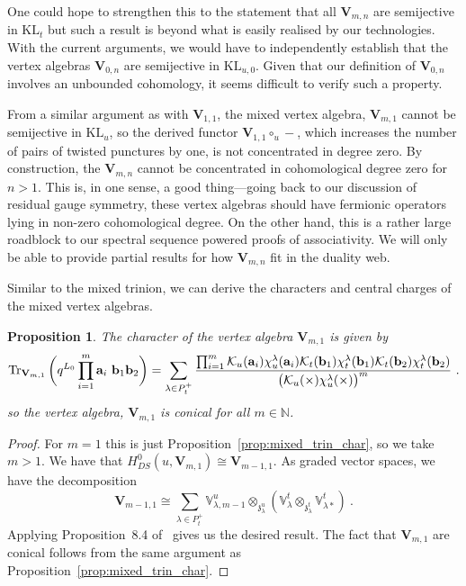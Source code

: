 \documentclass[a4paper]{article}
\newtheorem{prop}[thm]{Proposition}
\def\IN{\mathbb{N}}
\def\IV{\mathbb{V}}
\def\KK{{\cal K}}
\def\Tr{\mathop{\mathrm{Tr}}\nolimits}
\def \zf{\mathfrak{z}}
\def \KL{\mathrm{KL}}
\def\V{\mathbf{V}}
\begin{document}
One could hope to strengthen this to the statement that all $\V_{m,n}$ are semijective in $\KL_t$ but such a result is beyond what is easily realised by our technologies. With the current arguments, we would have to independently establish that the vertex algebras $\V_{0,n}$ are semijective in $\KL_{u,0}$. Given that our definition of $\V_{0,n}$ involves an unbounded cohomology, it seems difficult to verify such a property.

From a similar argument as with $\V_{1,1}$, the mixed vertex algebra, $\V_{m,1}$ cannot be semijective in $\KL_u$, so the derived functor $\V_{1,1}\circ_u-$, which increases the number of pairs of twisted punctures by one, is not concentrated in degree zero. By construction, the $\V_{m,n}$ cannot be concentrated in cohomological degree zero for $n>1$. This is, in one sense, a good thing---going back to our discussion of residual gauge symmetry, these vertex algebras should have fermionic operators lying in non-zero cohomological degree. On the other hand, this is a rather large roadblock to our spectral sequence powered proofs of associativity. We will only be able to provide partial results for how $\V_{m,n}$ fit in the duality web.

Similar to the mixed trinion, we can derive the characters and central charges of the mixed vertex algebras.
\begin{prop}\label{prop:mixed_char}
The character of the vertex algebra $\V_{m,1}$ is given by
\begin{equation*}
	\Tr_{\V_{m,1}}\bigg(q^{L_0}\prod_{i=1}^{m} \mathbf{a}_i \,\,\mathbf{b}_1\mathbf{b}_2\bigg) = \sum_{\lambda\in P_t^+} \frac{\prod_{i=1}^m \KK_u(\mathbf{a}_i)\chi^\lambda_u(\mathbf{a}_i) \KK_t(\mathbf{b}_1)\chi^\lambda_t(\mathbf{b}_1) \KK_t(\mathbf{b}_2)\chi^\lambda_t(\mathbf{b}_2) }{\big( \KK_u(\times)\chi^\lambda_u(\times) \big)^{m}}~.
\end{equation*}
so the vertex algebra, $\V_{m,1}$ is conical for all $m\in \IN$.
\end{prop}
\begin{proof}
For $m=1$ this is just Proposition~\ref{prop:mixed_trin_char}, so we take $m>1$. We have that $H^0_{DS}(u,\V_{m,1})\cong \V_{m-1,1}$. As graded vector spaces, we have the decomposition
\begin{equation*}
	\V_{m-1,1} \cong \sum_{\lambda\in P_t^+} \IV^u_{\lambda,m-1} \otimes_{\zf_\lambda^u}(\IV^t_{\lambda}\otimes_{\zf_\lambda^t}\IV^t_{\lambda*})~.
\end{equation*}
Applying Proposition~8.4 of~\cite{Arakawa:2018egx} gives us the desired result. The fact that $\V_{m,1}$ are conical follows from the same argument as Proposition~\ref{prop:mixed_trin_char}.
\end{proof}
\end{document}

